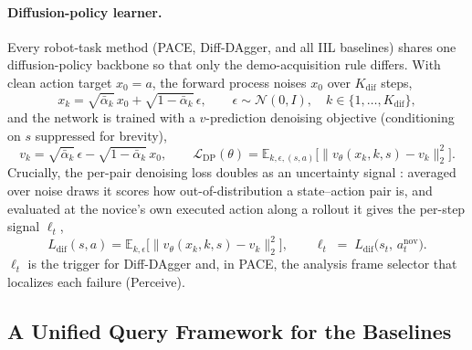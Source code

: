 \documentclass[letterpaper]{article} %
\begin{document}
\paragraph{Diffusion-policy learner.}
Every robot-task method (PACE, Diff-DAgger, and all IIL baselines) shares one
diffusion-policy backbone \cite{chi2023diffusionpolicy,ho2020ddpm,janner2022diffuser}
so that only the demo-acquisition rule differs. With clean action target
$x_0=a$, the forward process noises $x_0$ over $K_{\mathrm{dif}}$ steps,
\begin{equation}
x_k=\sqrt{\bar\alpha_k}\,x_0+\sqrt{1-\bar\alpha_k}\,\epsilon,
\qquad \epsilon\sim\mathcal{N}(0,I),\quad k\in\{1,\dots,K_{\mathrm{dif}}\},
\label{eq:forward}
\end{equation}
and the network is trained with a $v$-prediction denoising objective (conditioning
on $s$ suppressed for brevity),
\begin{equation}
v_k=\sqrt{\bar\alpha_k}\,\epsilon-\sqrt{1-\bar\alpha_k}\,x_0,
\qquad
\mathcal{L}_{\mathrm{DP}}(\theta)=\mathbb{E}_{k,\epsilon,(s,a)}\big[\big\|v_\theta(x_k,k,s)-v_k\big\|_2^2\big].
\label{eq:vpred}
\end{equation}
Crucially, the per-pair denoising loss doubles as an uncertainty signal
\cite{lee2025diffdagger}: averaged over noise draws it scores how out-of-distribution
a state--action pair is, and evaluated at the novice's own executed action along a
rollout it gives the per-step signal $\ell_t$,
\begin{equation}
L_{\mathrm{dif}}(s,a)=\mathbb{E}_{k,\epsilon}\big[\big\|v_\theta(x_k,k,s)-v_k\big\|_2^2\big],
\qquad
\ell_t \;=\; L_{\mathrm{dif}}\big(s_t,\,a^{\mathrm{nov}}_t\big).
\label{eq:diffsignal}
\end{equation}
$\ell_t$ is the trigger for Diff-DAgger and, in PACE, the analysis frame selector
that localizes each failure (Perceive).

\subsection{A Unified Query Framework for the Baselines}
\label{sec:unified}
\end{document}
